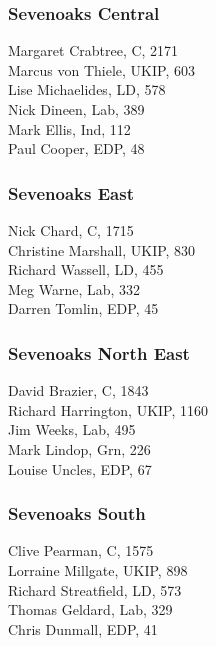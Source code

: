 \documentclass[a4paper,openany,10pt]{book}
\begin{document}
\subsubsection*{Sevenoaks Central}



Margaret Crabtree, C, 2171\\
Marcus von Thiele, UKIP, 603\\
Lise Michaelides, LD, 578\\
Nick Dineen, Lab, 389\\
Mark Ellis, Ind, 112\\
Paul Cooper, EDP, 48\\


\subsubsection*{Sevenoaks East}



Nick Chard, C, 1715\\
Christine Marshall, UKIP, 830\\
Richard Wassell, LD, 455\\
Meg Warne, Lab, 332\\
Darren Tomlin, EDP, 45\\


\subsubsection*{Sevenoaks North East}



David Brazier, C, 1843\\
Richard Harrington, UKIP, 1160\\
Jim Weeks, Lab, 495\\
Mark Lindop, Grn, 226\\
Louise Uncles, EDP, 67\\


\subsubsection*{Sevenoaks South}



Clive Pearman, C, 1575\\
Lorraine Millgate, UKIP, 898\\
Richard Streatfield, LD, 573\\
Thomas Geldard, Lab, 329\\
Chris Dunmall, EDP, 41\\
\end{document}
